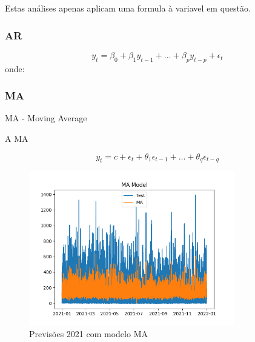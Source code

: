 Estas análises apenas aplicam uma formula à variavel em questão.

\subsubsection{AR}
\begin{equation} \label{eq:AR} 
    y_t = \beta_0 + \beta_1 y_{t-1} + \dots + \beta_p y_{t-p} + \epsilon_t 
\end{equation}
onde:

\subsubsection{MA}
MA - Moving Average

A MA 


\begin{equation} \label{eq:MA} 
    y_t = c + \epsilon_t + \theta_1 \epsilon_{t-1} + \dots + \theta_q \epsilon_{t-q}
\end{equation}

\begin{figure}[H]
    \centering
    \includegraphics[width=0.8\textwidth]{../plots/MA_model.png}
    \caption{Previsões 2021 com modelo MA}
    \label{fig:MA_model}
\end{figure}
  

